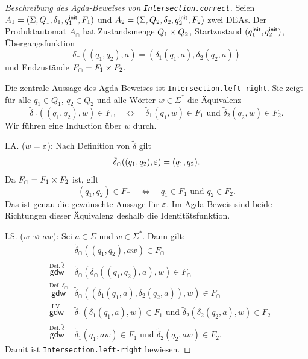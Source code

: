 \begin{proof}[Beschreibung des Agda-Beweises von \texttt{Intersection.correct}]
Seien
$A_1=(\Sigma,Q_1,\delta_1,q^\mathsf{init}_1,F_1)$ und
$A_2=(\Sigma,Q_2,\delta_2,q^\mathsf{init}_2,F_2)$ zwei \ac{DEA}s.
Der Produktautomat $A_\cap$ hat Zustandsmenge $Q_1\times Q_2$,
Startzustand $(q^\mathsf{init}_1,q^\mathsf{init}_2)$, Übergangsfunktion
\[
  \delta_\cap((q_1,q_2),a)
  =
  (\delta_1(q_1,a),\delta_2(q_2,a))
\]
und Endzustände $F_\cap=F_1\times F_2$.

Die zentrale Aussage des Agda-Beweises ist
\texttt{Intersection.left-right}.
Sie zeigt für alle $q_1\in Q_1$, $q_2\in Q_2$ und alle Wörter
$w\in\Sigma^*$ die Äquivalenz
\[
  \tilde{\delta}_\cap((q_1,q_2),w)\in F_\cap
  \quad\Longleftrightarrow\quad
  \tilde{\delta}_1(q_1,w)\in F_1
  \text{ und }
  \tilde{\delta}_2(q_2,w)\in F_2 .
\]
Wir führen eine Induktion über $w$ durch.

I.A. ($w=\varepsilon$):
Nach Definition von $\tilde{\delta}$ gilt
\[
  \tilde{\delta}_\cap((q_1,q_2),\varepsilon)=(q_1,q_2).
\]
Da $F_\cap=F_1\times F_2$ ist, gilt
\[
  (q_1,q_2)\in F_\cap
  \quad\Longleftrightarrow\quad
  q_1\in F_1 \text{ und } q_2\in F_2.
\]
Das ist genau die gewünschte Aussage für $\varepsilon$.
Im Agda-Beweis sind beide Richtungen dieser Äquivalenz deshalb die
Identitätsfunktion.

I.S. ($w\rightsquigarrow aw$):
Sei $a\in\Sigma$ und $w\in\Sigma^*$.
Dann gilt:
\begin{eqnarray*}
  &&\tilde{\delta}_\cap((q_1,q_2),aw)\in F_\cap\\
  &\stackrel{\text{Def.\ }\tilde{\delta}}{\mathsf{gdw}}&
    \tilde{\delta}_\cap(\delta_\cap((q_1,q_2),a),w)\in F_\cap\\
  &\stackrel{\text{Def.\ }\delta_\cap}{\mathsf{gdw}}&
    \tilde{\delta}_\cap((\delta_1(q_1,a),\delta_2(q_2,a)),w)\in F_\cap\\
  &\stackrel{\text{I.V.}}{\mathsf{gdw}}&
    \tilde{\delta}_1(\delta_1(q_1,a),w)\in F_1
    \text{ und }
    \tilde{\delta}_2(\delta_2(q_2,a),w)\in F_2\\
  &\stackrel{\text{Def.\ }\tilde{\delta}}{\mathsf{gdw}}&
    \tilde{\delta}_1(q_1,aw)\in F_1
    \text{ und }
    \tilde{\delta}_2(q_2,aw)\in F_2.
\end{eqnarray*}
Damit ist \texttt{Intersection.left-right} bewiesen.


\end{proof}
